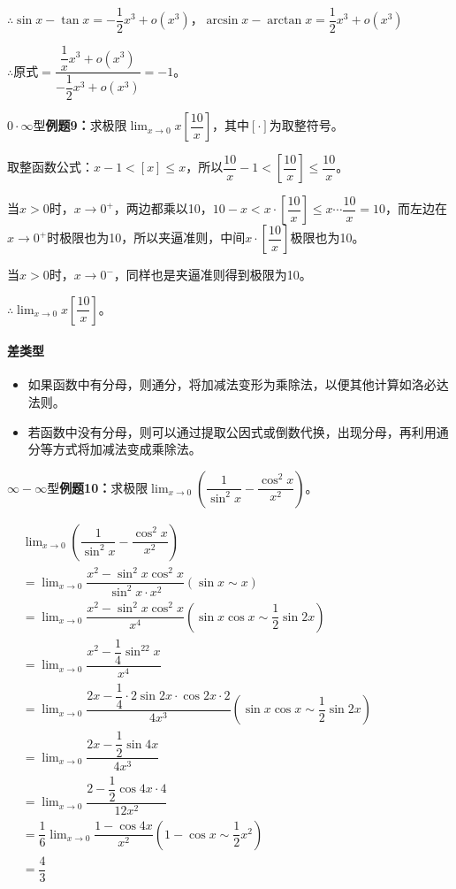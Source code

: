\documentclass[UTF8, 12pt]{ctexart}
\begin{document}
$\therefore \sin x-\tan x=-\dfrac{1}{2}x^3+o(x^3)$，$\arcsin x-\arctan x=\dfrac{1}{2}x^3+o(x^3)$

$\therefore \text{原式}=\dfrac{\dfrac{1}{x}x^3+o(x^3)}{-\dfrac{1}{2}x^3+o(x^3)}=-1$。

$0\cdot\infty$型\textbf{例题9：}求极限$\lim_{x\to 0}x\left[\dfrac{10}{x}\right]$，其中$[\cdot]$为取整符号。

取整函数公式：$x-1<[x]\leqslant x$，所以$\dfrac{10}{x}-1<\left[\dfrac{10}{x}\right]\leqslant\dfrac{10}{x}$。

当$x>0$时，$x\to 0^+$，两边都乘以10，$10-x<x\cdot\left[\dfrac{10}{x}\right]\leqslant x\cdots\dfrac{10}{x}=10$，而左边在$x\to 0^+$时极限也为10，所以夹逼准则，中间$x\cdot\left[\dfrac{10}{x}\right]$极限也为10。

当$x>0$时，$x\to 0^-$，同样也是夹逼准则得到极限为10。

$\therefore \lim_{x\to 0}x\left[\dfrac{10}{x}\right]$。

\paragraph{差类型} \leavevmode \bigskip

\begin{itemize}
    \item 如果函数中有分母，则通分，将加减法变形为乘除法，以便其他计算如洛必达法则。
    \item 若函数中没有分母，则可以通过提取公因式或倒数代换，出现分母，再利用通分等方式将加减法变成乘除法。
\end{itemize}

$\infty-\infty$型\textbf{例题10：}求极限$\lim_{x\to 0}\left(\dfrac{1}{\sin^2x}-\dfrac{\cos^2x}{x^2}\right)$。

$
\begin{aligned}
    & \lim_{x\to 0}\left(\dfrac{1}{\sin^2x}-\dfrac{\cos^2x}{x^2}\right) \\
    & = \lim_{x\to 0}\dfrac{x^2-\sin^2x\cos^2x}{\sin^2x\cdot x^2} (\sin x\sim x)\\
    & = \lim_{x\to 0}\dfrac{x^2-\sin^2x\cos^2x}{x^4} (\sin x\cos x\sim\dfrac{1}{2}\sin 2x)\\
    & = \lim_{x\to 0}\dfrac{x^2-\dfrac{1}{4}\sin^22x}{x^4} \\
    & = \lim_{x\to 0}\dfrac{2x-\dfrac{1}{4}\cdot 2\sin 2x\cdot\cos 2x\cdot 2}{4x^3} (\sin x\cos x\sim\dfrac{1}{2}\sin 2x)\\
    & = \lim_{x\to 0}\dfrac{2x-\dfrac{1}{2}\sin 4x}{4x^3} \\
    & = \lim_{x\to 0}\dfrac{2-\dfrac{1}{2}\cos 4x\cdot 4}{12x^2} \\
    & = \dfrac{1}{6}\lim_{x\to 0}\dfrac{1-\cos 4x}{x^2} (1-\cos x\sim \dfrac{1}{2}x^2)\\
    & = \dfrac{4}{3}
\end{aligned}
$
\end{document}
